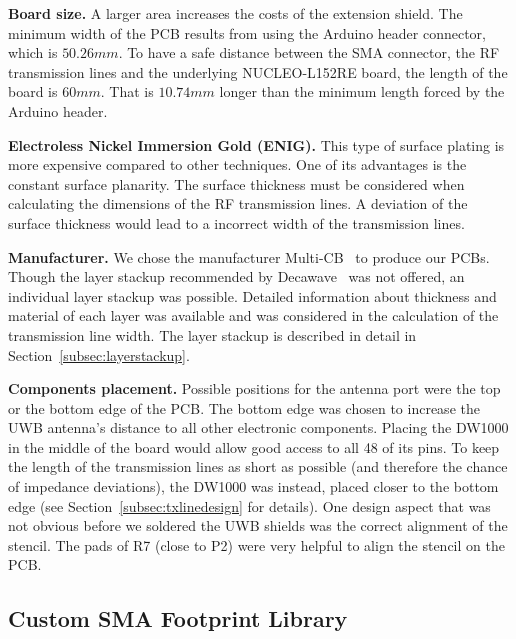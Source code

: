 \documentclass[journal,comsoc]{IEEEtran}
\begin{document}
\vspace*{0.5em}
\noindent\textbf{Board size.} A larger area increases the costs of the extension shield. 
The minimum width of the PCB results from using the Arduino header connector, which is $50.26mm$.
To have a safe distance between the SMA connector, the RF transmission lines and the underlying NUCLEO-L152RE board, the length of the board is $60mm$.
That is $10.74mm$ longer than the minimum length forced by the Arduino header.

\vspace*{0.5em}
\noindent\textbf{Electroless Nickel Immersion Gold (ENIG).} This type of surface plating is more expensive compared to other techniques.
One of its advantages is the constant surface planarity. 
The surface thickness must be considered when calculating the dimensions of the RF transmission lines. 
A deviation of the surface thickness would lead to a incorrect width of the transmission lines.

\vspace*{0.5em}
\noindent\textbf{Manufacturer.} We chose the manufacturer Multi-CB~\cite{mcbwebsite} to produce our PCBs.
Though the layer stackup recommended by Decawave~\cite[Figure 5]{dw1000hwdesignguide} was not offered, an individual layer stackup was possible. 
Detailed information about thickness and material of each layer was available and was considered in the calculation of the transmission line width.
The layer stackup is described in detail in Section~\ref{subsec:layerstackup}.

\vspace*{0.5em}
\noindent\textbf{Components placement.} Possible positions for the antenna port were the top or the bottom edge of the PCB. 
The bottom edge was chosen to increase the UWB antenna's distance to all other electronic components. 
Placing the DW1000 in the middle of the board would allow good access to all 48 of its pins. 
To keep the length of the transmission lines as short as possible (and therefore the chance of impedance deviations), the DW1000 was instead, placed closer to the bottom edge (see Section~\ref{subsec:txlinedesign} for details).
One design aspect that was not obvious before we soldered the UWB shields was the correct alignment of the stencil.
The pads of R7 (close to P2) were very helpful to align the stencil on the PCB. 

\subsection{Custom SMA Footprint Library}
\label{subsec:smafootprint}
\end{document}
